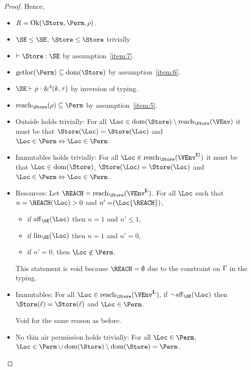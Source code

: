 \begin{proof}
  Hence,
  \begin{itemize}
  \item $R=\Ok{\Store, \Perm, \rho}$.
  \item $\SE \le \SE$, $\Store \le \Store$ trivially
  \item $\vdash \Store : \SE$ by assumption~\ref{item:7}.
  \item $\Rawloc{\Perm} \subseteq \Dom{\Store}$ by
    assumption~\ref{item:6}.
  \item $\SE \vdash \rho : \borrowty{k}{\tau}$ by inversion of typing.
  \item $\Reach{\Store}{\rho} \subseteq \Perm$ by assumption~\ref{item:5}.
  \item Outside holds trivially: For all $\Loc \in \Dom{\Store} \setminus
    \Reach{\Store}{\VEnv}$ it must be that
    $\Store (\Loc) = \Store (\Loc)$
    and $\Loc\in\Perm \Leftrightarrow \Loc\in\Perm$.
  \item Immutables holds trivially: For all $\Loc \in
    \Reach{\Store}{\ImmutableBorrows\VEnv}$ it must be that
    $\Loc\in\Dom\Store$,
    $\Store (\Loc) = \Store (\Loc)$
    and $\Loc\in\Perm \Leftrightarrow \Loc\in\Perm$.
  \item Resources:
    Let $\REACH =\Reach{\Store}{\Active\VEnv}$.
    For all $\Loc$ such that $n= \MultiNumber\Loc\REACH >0$ and $n' =
    \MultiNumber\Loc{\REACH}$,
    \begin{itemize}
    \item if $\Affine{\SE}\Loc$ then $n=1$ and $n'\le 1$,
    \item if $\Linear{\SE}\Loc$ then $n=1$ and $n' = 0$,
    \item if $n'=0$, then $\Loc\notin\Perm$.
    \end{itemize}

    This statement is void because $\REACH=\emptyset$ due to the
    constraint on $\Gamma$ in the typing.
  \item Immutables: For all $\Loc \in \Reach
    {\Store}{\Active\VEnv}$, if $\neg\Writeable{\SE}\Loc$ then
    $\Store (\ell) = \Store (\ell)$ and $\Loc\in \Perm$.

    Void for the same reason as before.
  \item No thin air permission holds trivially: For all $\Loc\in \Perm$, $\Loc
    \in \Perm \cup  \Dom{\Store} \setminus \Dom{\Store} = \Perm$.
  \end{itemize}


\end{proof}

